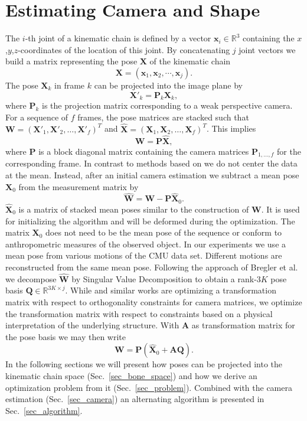 \documentclass[10pt,letterpaper]{article}
\begin{document}
\section{Estimating Camera and Shape}
\label{sec_cam_shape}
The $i$-th joint of a kinematic chain is defined by a vector $\bm{x}_i \in \mathbb{R}^3$ containing the $x$,$y$,$z$-coordinates of the location of this joint. By concatenating $j$ joint vectors we build a matrix representing the pose $\bm{X}$ of the kinematic chain
\begin{equation}
\label{eqn_pose}
\bm{X}=(\bm{x}_1, \bm{x}_2, \cdots, \bm{x}_j)
.
\end{equation}
The pose $\bm{X}_k$ in frame $k$ can be projected into the image plane by
\begin{equation}
	\bm{X}'_k=\bm{P}_k \bm{X}_k,
\end{equation}
where $\bm{P}_k$ is the projection matrix corresponding to a weak perspective camera. For a sequence of $f$ frames, the pose matrices are stacked such that $\bm{W}=(\bm{X}'_1, \bm{X}'_2, \dots , \bm{X}'_f)^T$ and $\hat{\bm{X}}=(\bm{X}_{1}, \bm{X}_{2}, \dots , \bm{X}_{f})^T$. This implies
\begin{equation}
\bm{W}=\bm{P} \hat{\bm{X}},
\end{equation}
where $\bm{P}$ is a block diagonal matrix containing the camera matrices $\bm{P}_{1,\dots,f}$ for the corresponding frame. In contrast to methods based on \cite{Bregler2000} we do not center the data at the mean. Instead, after an initial camera estimation we subtract a mean pose $\bm{X}_0$ from the measurement matrix by
\begin{equation}
\hat{\bm{W}}=\bm{W} - \bm{P} \hat{\bm{X}}_0
.
\end{equation}
$\hat{\bm{X}}_0$ is a matrix of stacked mean poses similar to the construction of $\bm{W}$. It is used for initializing the algorithm and will be deformed during the optimization. The matrix $\bm{X}_0$ does not need to be the mean pose of the sequence or conform to anthropometric measures of the observed object. In our experiments we use a mean pose from various motions of the CMU data set. Different motions are reconstructed from the same mean pose. Following the approach of Bregler et al. \cite{Bregler2000} we decompose $\hat{\bm{W}}$ by Singular Value Decomposition to obtain a rank-$3K$ pose basis $\bm{Q} \in \mathbb{R}^{3K\times j}$. While \cite{Bregler2000} and similar works are optimizing a transformation matrix with respect to orthogonality constraints for camera matrices, we optimize the transformation matrix with respect to constraints based on a physical interpretation of the underlying structure. With $\bm{A}$ as transformation matrix for the pose basis we may then write
\begin{equation}
\label{eqn_projection}
\bm{W}=\bm{P} (\hat{\bm{X}}_0 + \bm{A}\bm{Q})
.
\end{equation}
In the following sections we will present how poses can be projected into the kinematic chain space (Sec.~\ref{sec_bone_space}) and how we derive an optimization problem from it (Sec.~\ref{sec_problem}). Combined with the camera estimation (Sec.~\ref{sec_camera}) an alternating algorithm is presented in Sec.~\ref{sec_algorithm}.
\end{document}
